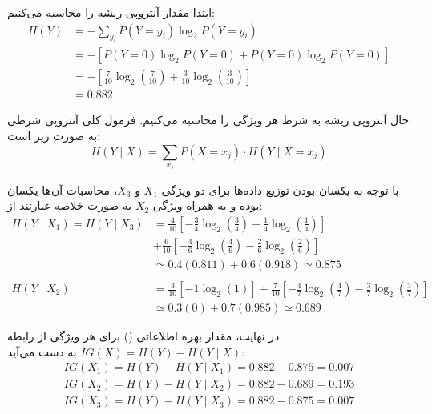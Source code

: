 \question{}

\begin{ابجد}
\item ابتدا مقدار آنتروپی ریشه را محاسبه می‌کنیم:
\begin{align*}
    H(Y) & = -\sum_{y_i}P(Y = y_i)\log_2 P(Y = y_i)                                 \\
         & = -[P(Y = 0)\log_2 P(Y = 0) + P(Y = 0)\log_2 P(Y = 0)]                   \\
         & = -[\frac{7}{10}\log_2(\frac{7}{10}) + \frac{3}{10}\log_2(\frac{3}{10})] \\
         & = 0.882
\end{align*}

حال آنتروپی ریشه به شرط هر ویژگی را محاسبه می‌کنیم. فرمول کلی آنتروپی شرطی به صورت زیر است:
\begin{equation*}
    H(Y \mid X) = \sum_{x_j} P(X = x_j) \cdot H(Y \mid X = x_j)
\end{equation*}

با توجه به یکسان بودن توزیع داده‌ها برای دو ویژگی $X_1$ و $X_3$، محاسبات آن‌ها یکسان بوده و به همراه ویژگی $X_2$ به صورت خلاصه عبارتند از:
\begin{align*}
    H(Y \mid X_1) = H(Y \mid X_3) & = \frac{4}{10} \left[ -\frac{3}{4}\log_2\left(\frac{3}{4}\right) - \frac{1}{4}\log_2\left(\frac{1}{4}\right) \right]                                           \\
                                  & + \frac{6}{10} \left[ -\frac{4}{6}\log_2\left(\frac{4}{6}\right) - \frac{2}{6}\log_2\left(\frac{2}{6}\right) \right]                                           \\
                                  & \simeq 0.4(0.811) + 0.6(0.918) \simeq 0.875                                                                                                                    \\
    \\
    H(Y \mid X_2)                 & = \frac{3}{10} \left[ -1\log_2(1) \right] + \frac{7}{10} \left[ -\frac{4}{7}\log_2\left(\frac{4}{7}\right) - \frac{3}{7}\log_2\left(\frac{3}{7}\right) \right] \\
                                  & \simeq 0.3(0) + 0.7(0.985) \simeq 0.689
\end{align*}

در نهایت، مقدار بهره اطلاعاتی () برای هر ویژگی از رابطه $IG(X) = H(Y) - H(Y \mid X)$ به دست می‌آید:
\begin{align*}
    IG(X_1) = H(Y) - H(Y \mid X_1) = 0.882 - 0.875 = 0.007 \\
    IG(X_2) = H(Y) - H(Y \mid X_2) = 0.882 - 0.689 = 0.193 \\
    IG(X_3) = H(Y) - H(Y \mid X_3) = 0.882 - 0.875 = 0.007
\end{align*}


\end{ابجد}
